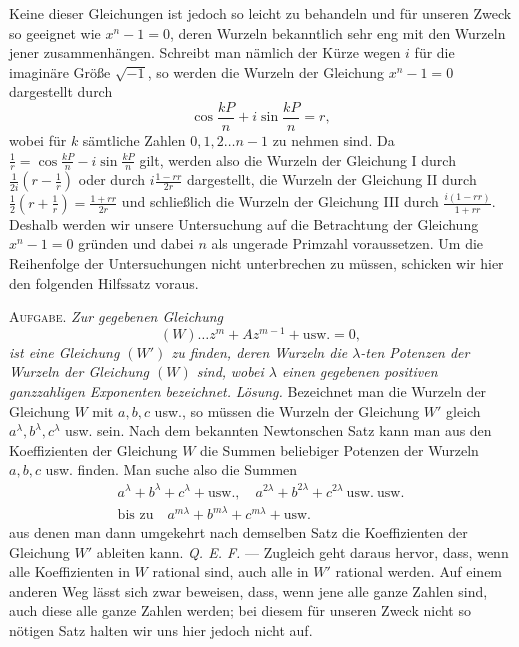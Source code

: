 Keine dieser Gleichungen ist jedoch so leicht zu behandeln und für unseren Zweck so geeignet wie \(x^n-1=0\), deren Wurzeln bekanntlich sehr eng mit den Wurzeln jener zusammenhängen. Schreibt man nämlich der Kürze wegen \(i\) für die imaginäre Größe \(\surd{-1}\), so werden die Wurzeln der Gleichung \(x^n-1=0\) dargestellt durch \[\cos\frac{kP}n+i\sin\frac{kP}n=r,\]
wobei für \(k\) sämtliche Zahlen \(0,\allowbreak 1,\allowbreak 2\ldots n-1\) zu nehmen sind. Da \(\frac1r=\cos\frac{kP}n-i\sin\frac{kP}n\) gilt, werden also die Wurzeln der Gleichung I durch \(\frac1{2i}(r-\frac1r)\) oder durch \(i\frac{1-rr}{2r}\) dargestellt, die Wurzeln der Gleichung II durch \(\frac12(r+\frac1r)=\frac{1+rr}{2r}\) und schließlich die Wurzeln der Gleichung III durch \(\frac{i(1-rr)}{1+rr}\). Deshalb werden wir unsere Untersuchung auf die Betrachtung der Gleichung \(x^n-1=0\) gründen und dabei \(n\) als ungerade Primzahl voraussetzen. Um die Reihenfolge der Untersuchungen nicht unterbrechen zu müssen, schicken wir hier den folgenden Hilfssatz voraus.

\clearpage
{}
\textsc{Aufgabe.} \textit{Zur gegebenen Gleichung} \[(W)\ldots z^m+Az^{m-1}+\mathrm{usw.}=0,\] \textit{ist eine Gleichung \((W')\) zu finden, deren Wurzeln die \(\lambda\)-ten Potenzen der Wurzeln der Gleichung \((W)\) sind,} \textit{wobei \(\lambda\) einen gegebenen positiven ganzzahligen Exponenten bezeichnet.} \textit{Lösung.} Bezeichnet man die Wurzeln der Gleichung \(W\) mit \(a,\allowbreak b,\allowbreak c\) usw., so müssen die Wurzeln der Gleichung \(W'\) gleich \(a^\lambda,\allowbreak b^\lambda,\allowbreak c^\lambda\) usw. sein. Nach dem bekannten Newtonschen Satz kann man aus den Koeffizienten der Gleichung \(W\) die Summen beliebiger Potenzen der Wurzeln \(a,\allowbreak b,\allowbreak c\) usw. finden. Man suche also die Summen \[\begin{gathered}
a^\lambda+b^\lambda+c^\lambda+\mathrm{usw.},\quad
a^{2\lambda}+b^{2\lambda}+c^{2\lambda}\ \mathrm{usw.}\ \mathrm{usw.}\\
\text{bis zu}\quad a^{m\lambda}+b^{m\lambda}+c^{m\lambda}+\mathrm{usw.}
\end{gathered}\] aus denen man dann umgekehrt nach demselben Satz die Koeffizienten der Gleichung \(W'\) ableiten kann. \textit{Q. E. F.} — Zugleich geht daraus hervor, dass, wenn alle Koeffizienten in \(W\) rational sind, auch alle in \(W'\) rational werden. Auf einem anderen Weg lässt sich zwar beweisen, dass, wenn jene alle ganze Zahlen sind, auch diese alle ganze Zahlen werden; bei diesem für unseren Zweck nicht so nötigen Satz halten wir uns hier jedoch nicht auf.

